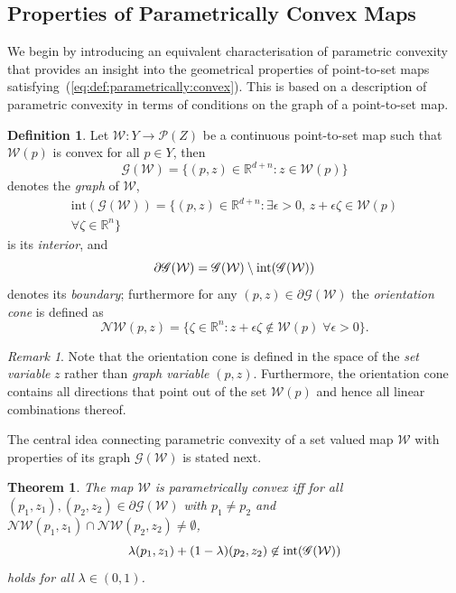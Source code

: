 \documentclass[journal]{IEEEtran}
\newcounter{thmcount}
\newtheorem{thm}[thmcount]{Theorem}
\theoremstyle{remark}
\newtheorem{rem}[thmcount]{Remark}
\theoremstyle{definition}
\newtheorem{defi}[thmcount]{Definition}
\begin{document}
\subsection{Properties of Parametrically Convex Maps}\label{ssec:properties:of:p:convex:maps}
%
We begin by introducing an equivalent characterisation of parametric convexity that provides an insight into the geometrical properties of 
point-to-set maps satisfying~(\ref{eq:def:parametrically:convex}).
This is based on a description of parametric convexity in terms of conditions on the graph of a point-to-set map.
%
\begin{defi}\label{def:graph:of:map}
Let $\mathcal W:Y\rightarrow \mathscr P(Z)$ be a continuous point-to-set map
such that $\mathcal W(p)$ is convex for all $p\in Y$, then 
%
\[
\mathscr G(\mathcal W) = \{(p,z) \in\mathbb R^{d+n}: z\in\mathcal W(p)\}
\]
%
denotes the \emph{graph} of $\mathcal W$,
%
\begin{multline*}  
\text{int}(\mathscr G(\mathcal W)) = \{(p,z) \in\mathbb R^{d+n} : \exists \epsilon>0, \, z+\epsilon \zeta\in \mathcal W(p) \\ \forall \zeta\in\mathbb R^n\}
\end{multline*}
%
is its \emph{interior}, and
%
\[
  \partial \mathscr G(\mathcal W) = \mathscr G(\mathcal W)\setminus \textup{int}(\mathscr G(\mathcal W))
\]
%
denotes its \emph{boundary};
%
furthermore for any $(p,z)\in\partial\mathscr G(\mathcal W)$ the \emph{orientation cone} is defined as 
%
\[
  \mathcal N\mathcal W(p,z) = \{\zeta \in\mathbb R^n: z+\epsilon \zeta \not\in \mathcal W(p)\; \forall \epsilon>0\} .
\]

\end{defi}
%
\begin{rem}
%
Note that the orientation cone is defined in the space of the
\emph{set variable} $z$ rather than \emph{graph variable} $(p,z)$.
%
Furthermore, the orientation cone contains all directions that 
point out of the set $\mathcal W(p)$ and hence all linear combinations thereof.
%
\end{rem}
%
The central idea connecting parametric convexity of a set valued map $\mathcal W$ with properties of its graph $\mathscr G(\mathcal W)$ is stated next.
%
\begin{thm}\label{thm:p:convexity:graph}
The map $\mathcal W$ is parametrically convex iff for all $(p_1,z_1), (p_2,z_2)\in\partial\mathscr G(\mathcal W)$
with $p_1\neq p_2$ and $\mathcal N\mathcal W(p_1,z_1)\cap\mathcal N\mathcal W(p_2,z_2)\neq\emptyset$,
%
\begin{equation}\label{eq:graph:def:p:convexity}
\lambda (p_1,z_1) + (1-\lambda) (p_2,z_2) \not\in\textup{int} (\mathscr G(\mathcal W))
\end{equation}
%
holds for all $\lambda\in(0,1)$.
%
\end{thm}
\end{document}
